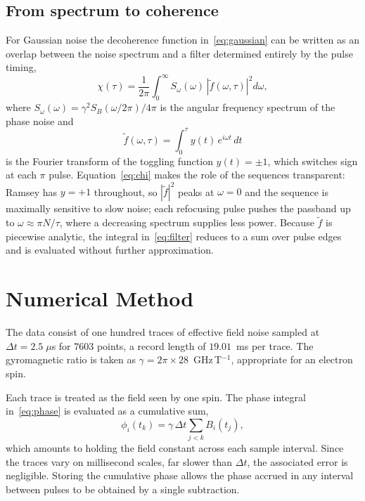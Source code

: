 \documentclass[conference]{IEEEtran}
\begin{document}
\subsection{From spectrum to coherence}

For Gaussian noise the decoherence function in~\eqref{eq:gaussian} can be written
as an overlap between the noise spectrum and a filter determined entirely by the
pulse timing,
\begin{equation}
\chi(\tau) = \frac{1}{2\pi}\int_0^\infty
S_\omega(\omega)\,\left|\tilde{f}(\omega,\tau)\right|^2 d\omega ,
\label{eq:chi}
\end{equation}
where $S_\omega(\omega) = \gamma^2 S_B(\omega/2\pi)/4\pi$ is the angular frequency
spectrum of the phase noise and
\begin{equation}
\tilde{f}(\omega,\tau) = \int_0^{\tau} y(t)\,e^{i\omega t}\,dt
\label{eq:filter}
\end{equation}
is the Fourier transform of the toggling function $y(t)=\pm 1$, which switches
sign at each $\pi$ pulse. Equation~\eqref{eq:chi} makes the role of the sequences
transparent: Ramsey has $y=+1$ throughout, so $|\tilde{f}|^2$ peaks at
$\omega=0$ and the sequence is maximally sensitive to slow noise; each refocusing
pulse pushes the passband up to $\omega \approx \pi N/\tau$, where a decreasing
spectrum supplies less power. Because $\tilde{f}$ is piecewise analytic, the
integral in~\eqref{eq:filter} reduces to a sum over pulse edges and is evaluated
without further approximation.

\section{Numerical Method}\label{sec:methods}

The data consist of one hundred traces of effective field noise sampled at
$\Delta t = 2.5\;\mu$s for $7603$ points, a record length of $19.01$~ms per trace.
The gyromagnetic ratio is taken as $\gamma = 2\pi \times 28$~GHz\,T$^{-1}$,
appropriate for an electron spin.

Each trace is treated as the field seen by one spin. The phase integral
in~\eqref{eq:phase} is evaluated as a cumulative sum,
\begin{equation}
\phi_i(t_k) = \gamma\,\Delta t \sum_{j<k} B_i(t_j) ,
\end{equation}
which amounts to holding the field constant across each sample interval. Since the
traces vary on millisecond scales, far slower than $\Delta t$, the associated error
is negligible. Storing the cumulative phase allows the phase accrued in any
interval between pulses to be obtained by a single subtraction.
\end{document}
